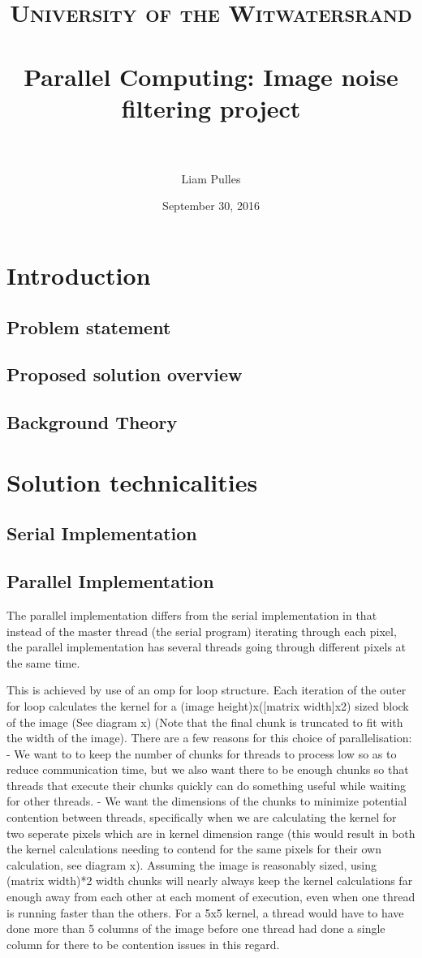 \documentclass[paper=a4, fontsize=11pt]{scrartcl} %
\title{	
\normalfont \normalsize 
\textsc{University of the Witwatersrand} \\ [25pt] %
\horrule{0.5pt} \\[0.4cm] %
\huge Parallel Computing: Image noise filtering project \\ %
\horrule{2pt} \\[0.5cm] %
}
\author{Liam Pulles} %
\date{\normalsize September 30, 2016} %
\numberwithin{equation}{section} %
\numberwithin{figure}{section} %
\numberwithin{table}{section} %
\begin{document}
\maketitle %

\section{Introduction}
\subsection{Problem statement}
\subsection{Proposed solution overview}
\subsection{Background Theory}

\section{Solution technicalities}
\subsection{Serial Implementation}
\subsection{Parallel Implementation}
The parallel implementation differs from the serial implementation in that instead of the master thread (the serial program) iterating through each pixel, the parallel implementation has several threads going through different pixels at the same time.

This is achieved by use of an omp for loop structure. Each iteration of the outer for loop calculates the kernel for a (image height)x([matrix width]x2) sized block of the image (See diagram x) (Note that the final chunk is truncated to fit with the width of the image).  There are a few reasons for this choice of parallelisation:
- We want to to keep the number of chunks for threads to process low so as to reduce communication time, but we also want there to be enough chunks so that threads that execute their chunks quickly can do something useful while waiting for other threads.
- We want the dimensions of the chunks to minimize potential contention between threads, specifically when we are calculating the kernel for two seperate pixels which are in kernel dimension range (this would result in both the kernel calculations needing to contend for the same pixels for their own calculation, see diagram x). Assuming the image is reasonably sized, using (matrix width)*2 width chunks will nearly always keep the kernel calculations far enough away from each other at each moment of execution, even when one thread is running faster than the others. For a 5x5 kernel, a thread would have to have done more than 5 columns of the image before one thread had done a single column for there to be contention issues in this regard.
\end{document}

